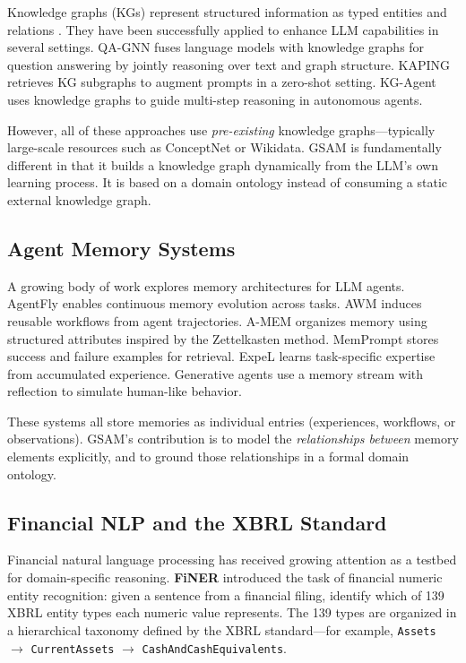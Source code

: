 \documentclass[12pt,a4paper,oneside]{article}
\begin{document}
Knowledge graphs (KGs) represent structured information as typed entities and relations \citep{hogan2021knowledge}. They have been successfully applied to enhance LLM capabilities in several settings. QA-GNN \citep{yasunaga2021qagnn} fuses language models with knowledge graphs for question answering by jointly reasoning over text and graph structure. KAPING \citep{baek2023kaping} retrieves KG subgraphs to augment prompts in a zero-shot setting. KG-Agent \citep{jiang2024kgagent} uses knowledge graphs to guide multi-step reasoning in autonomous agents.

However, all of these approaches use \textit{pre-existing} knowledge graphs---typically large-scale resources such as ConceptNet \citep{speer2017conceptnet} or Wikidata. GSAM is fundamentally different in that it builds a knowledge graph dynamically from the LLM's own learning process. It is based on a domain ontology instead of consuming a static external knowledge graph.

\subsection{Agent Memory Systems}

A growing body of work explores memory architectures for LLM agents. AgentFly \citep{zhou2025agentfly} enables continuous memory evolution across tasks. AWM \citep{wang2024awm} induces reusable workflows from agent trajectories. A-MEM \citep{xu2025amem} organizes memory using structured attributes inspired by the Zettelkasten method. MemPrompt \citep{madaan2022memory} stores success and failure examples for retrieval. ExpeL \citep{zhao2024expel} learns task-specific expertise from accumulated experience. Generative agents \citep{park2023generative} use a memory stream with reflection to simulate human-like behavior.

These systems all store memories as individual entries (experiences, workflows, or observations). GSAM's contribution is to model the \textit{relationships between} memory elements explicitly, and to ground those relationships in a formal domain ontology.

\subsection{Financial NLP and the XBRL Standard}
\label{sec:xbrl-background}

Financial natural language processing has received growing attention as a testbed for domain-specific reasoning. \textbf{FiNER} \citep{loukas2022finer} introduced the task of financial numeric entity recognition: given a sentence from a financial filing, identify which of 139 XBRL entity types each numeric value represents. The 139 types are organized in a hierarchical taxonomy defined by the XBRL standard---for example, \texttt{Assets} $\rightarrow$ \texttt{CurrentAssets} $\rightarrow$ \texttt{CashAndCashEquivalents}.
\end{document}
